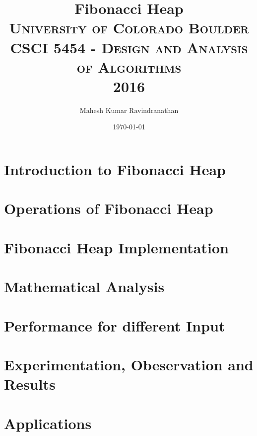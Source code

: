 \documentclass[10pt]{sig-alternate-05-2015}
\title{Fibonacci Heap \\ \textsc{University of Colorado Boulder} \\ \textsc{CSCI 5454 - Design and Analysis of Algorithms} \\ \textsc{2016} } %
\author{Mahesh Kumar Ravindranathan } %
\date{\today} %
\begin{document}
\maketitle %


\section{Introduction to Fibonacci Heap}

\section{Operations of Fibonacci Heap}

\section{Fibonacci Heap Implementation}

\section{Mathematical Analysis}

\section{Performance for different Input}

\section{Experimentation, Obeservation and Results}

\section{Applications}






\end{document}
